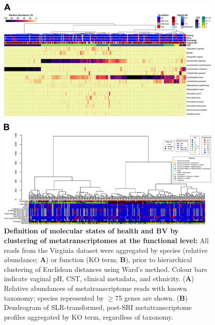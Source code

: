 \documentclass[sn-mathphys,Numbered]{sn-jnl}%
\begin{document}
\begin{figure}[H]
    \centering
    \includegraphics[scale = 0.795]{0_supplFig2.png}
    \caption{\textbf{Definition of molecular states of health and BV by clustering of metatranscriptomes at the functional level:} All reads from the Virginia dataset were aggregated by species (relative abundance; \textbf{A}) or function (KO term; \textbf{B}), prior to hierarchical clustering of Euclidean distances using Ward's method. Colour bars indicate vaginal pH, CST, clinical metadata, and ethnicity. (\textbf{A}) Relative abundances of metatranscriptome reads with known taxonomy; species represented by $\geq$75 genes are shown. (\textbf{B}) Dendrogram of SLR-transformed, post-SRI metatranscriptome profiles aggregated by KO term, regardless of taxonomy.} \label{sig:sfigVirgDendro}
\end{figure}
\newpage
\end{document}

